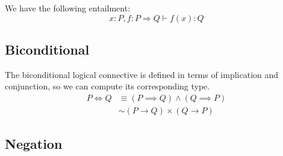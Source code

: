 \documentclass[11pt, oneside]{article}   	%
\begin{document}
We have the following entailment:
$$
x : P, f : P \Rightarrow Q \vdash f(x) : Q
$$

\subsection{Biconditional}

The biconditional logical connective is defined in terms of implication and conjunction, so we can compute its corresponding
type.
\begin{align*}
P \Leftrightarrow Q	&\equiv (P \implies Q) \land (Q \implies P) \\
				&\sim (P \rightarrow Q) \times (Q \rightarrow P) 
\end{align*}

\subsection{Negation}
\end{document}
